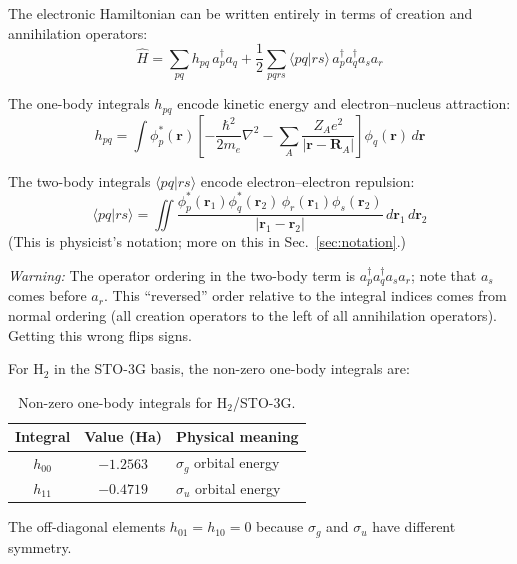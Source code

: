 \documentclass[aps,prb,preprint,longbibliography,nofootinbib]{revtex4-2}
\begin{document}
The electronic Hamiltonian can be written entirely in terms of creation
and annihilation operators:
\begin{equation}
\hat{H} = \sum_{pq} h_{pq}\, a^\dagger_p a_q
         + \frac{1}{2}\sum_{pqrs}
           \langle pq|rs\rangle\, a^\dagger_p a^\dagger_q a_s a_r
\label{eq:second-quant-hamiltonian}
\end{equation}

The one-body integrals $h_{pq}$ encode kinetic energy and
electron--nucleus attraction:
\begin{equation}
h_{pq} = \int \phi_p^*(\mathbf{r}) \left[-\frac{\hbar^2}{2m_e}\nabla^2
         - \sum_A \frac{Z_A e^2}{|\mathbf{r} - \mathbf{R}_A|}\right]
         \phi_q(\mathbf{r})\, d\mathbf{r}
\end{equation}

The two-body integrals $\langle pq|rs \rangle$ encode electron--electron
repulsion:
\begin{equation}
\langle pq|rs\rangle = \iint
  \frac{\phi_p^*(\mathbf{r}_1)\phi_q^*(\mathbf{r}_2)\,
        \phi_r(\mathbf{r}_1)\phi_s(\mathbf{r}_2)}
       {|\mathbf{r}_1 - \mathbf{r}_2|}\,
  d\mathbf{r}_1\, d\mathbf{r}_2
\end{equation}
(This is physicist's notation; more on this in Sec.~\ref{sec:notation}.)

\emph{Warning:}  The operator ordering in the two-body term is
$a^\dagger_p a^\dagger_q a_s a_r$; note that $a_s$ comes before
$a_r$.  This ``reversed'' order relative to the integral indices comes
from normal ordering (all creation operators to the left of all
annihilation operators).  Getting this wrong flips signs.

For H$_2$ in the STO-3G basis, the non-zero one-body integrals are:

\begin{table}[h]
\centering
\begin{tabular}{@{}ccl@{}}
\toprule
\textbf{Integral} & \textbf{Value (Ha)} & \textbf{Physical meaning} \\
\midrule
$h_{00}$ & $-1.2563$ & $\sigma_g$ orbital energy \\
$h_{11}$ & $-0.4719$ & $\sigma_u$ orbital energy \\
\bottomrule
\end{tabular}
\caption{Non-zero one-body integrals for H$_2$/STO-3G.}
\label{tab:one-body}
\end{table}

The off-diagonal elements $h_{01} = h_{10} = 0$ because $\sigma_g$ and
$\sigma_u$ have different symmetry.
\end{document}
